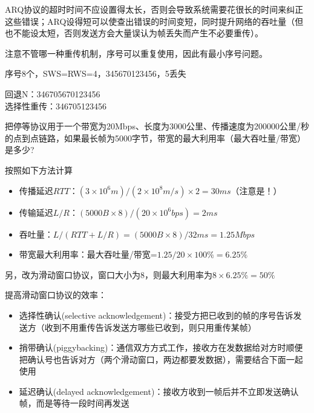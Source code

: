 ARQ协议的超时时间不应设置得太长，否则会导致系统需要花很长的时间来纠正这些错误；ARQ设得短可以使查出错误的时间变短，同时提升网络的吞吐量（但也不能设太短，否则发送方会大量误认为帧丢失而产生不必要重传）。


注意不管哪一种重传机制，序号可以重复使用，因此有最小序号问题。

\begin{example}
	序号8个，SWS=RWS=4，345670123456，5丢失
\end{example}
\begin{analysis}
	回退N：346705670123456\\
	选择性重传：346705123456
\end{analysis}

\begin{example}
	把停等协议用于一个带宽为20Mbps、长度为3000公里、传播速度为200000公里/秒的点到点链路，如果最长帧为5000字节，带宽的最大利用率（最大吞吐量/带宽）是多少?
\end{example}
\begin{analysis}
	按照如下方法计算
	\begin{itemize}
		\item 传播延迟$RTT$：$(3\times 10^6 m) / (2\times 10^8 m/s)\times 2=30ms$（注意是！）
		\item 传输延迟$L/R$：$(5000B\times 8)/(20\times 10^6bps)=2ms$
		\item 吞吐量：$L/(RTT+L/R)=(5000B\times 8)/32ms=1.25Mbps$
		\item 带宽最大利用率：最大吞吐量/带宽=$1.25/20\times 100\%=6.25\%$
	\end{itemize}
	另，改为滑动窗口协议，窗口大小为8，则最大利用率为$8\times 6.25\%=50\%$
\end{analysis}

\myhline
提高滑动窗口协议的效率：
\begin{itemize}
	\item 选择性确认(selective acknowledgement)：接受方把已收到的帧的序号告诉发送方（收到不用重传告诉发送方哪些已收到，则只用重传某帧）
	\item 捎带确认(piggybacking)：通信双方方式工作，接收方在发数据给对方时顺便把确认号也告诉对方（两个滑动窗口，两边都要发数据），需要结合下面一起使用
	\item 延迟确认(delayed acknowledgement)：接收方收到一帧后并不立即发送确认帧，而是等待一段时间再发送
\end{itemize}

